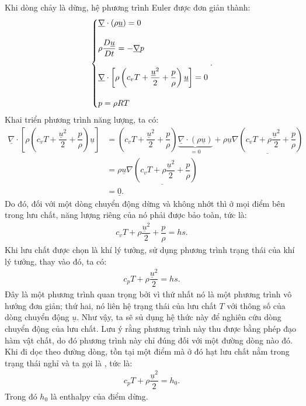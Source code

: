 \documentclass[../../../main.tex]{subfiles}
\begin{document}
Khi dòng chảy là dừng, hệ phương trình Euler được đơn giản thành:
	\begin{equation}
		\begin{dcases}
				\underline{\nabla}\cdot\left(\rho \underline{u}\right)=0\\[10pt]
				\rho\dfrac{D\underline{u}}{Dt}=-\underline{\nabla}p\\[10pt]
				\underline{\nabla}\cdot\left[\rho\left(c_vT+\dfrac{\underline{u}^2}{2}+\dfrac{p}{\rho}\right)\underline{u}\right]=0\\[10pt]
				p=\rho RT
		\end{dcases}.
	\end{equation}
Khai triển phương trình năng lượng, ta có:
	\[
		\begin{aligned}
			\underline{\nabla}\cdot\left[\rho\left(c_vT+\dfrac{\underline{u}^2}{2}+\dfrac{p}{\rho}\right)\underline{u}\right]&=\left(c_vT+\dfrac{\underline{u}^2}{2}+\dfrac{p}{\rho}\right)\underbrace{\underline{\nabla}\cdot\left(\rho\underline{u}\right)}_{=0}+\rho\underline{u}\underline{\nabla\left(c_vT+\rho\dfrac{\underline{u}^2}{2}+\dfrac{p}{\rho}\right)}\\
			&=\rho\underline{u}\underline{\nabla\left(c_vT+\rho\dfrac{\underline{u}^2}{2}+\dfrac{p}{\rho}\right)}\\
			&=\underline{0}.
		\end{aligned}
	\]
Do đó, đối với một dòng chuyển động dừng và không nhớt thì ở mọi điểm bên trong lưu chất, năng lượng riêng của nó phải được bảo toàn, tức là:
	\begin{align}
		\boxed{c_vT+\rho\dfrac{\underline{u}^2}{2}+\dfrac{p}{\rho}=hs}.
	\end{align}
Khi lưu chất được chọn là khí lý tưởng, sử dụng phương trình trạng thái của khí lý tưởng, thay vào đó, ta có:
	\begin{align}
		\boxed{c_pT+\rho\dfrac{\underline{u}^2}{2}=hs}.
	\end{align}
Đây là một phương trình quan trọng bởi vì thứ nhất nó là một phương trình vô hướng đơn giản; thứ hai, nó liên hệ trạng thái của lưu chất $T$ với thông số của dòng chuyển động $\underline{u}$. Như vậy, ta sẽ sủ dụng hệ thức này để nghiên cứu dòng chuyển động của lưu chất. Lưu ý rằng phương trình này thu được bằng phép đạo hàm vật chất, do đó phương trình này chỉ đúng đối với một đường dòng nào đó. Khi đi dọc theo đường dòng, tồn tại một điểm mà ở đó hạt lưu chất nằm trong trạng thái nghỉ và ta gọi là , tức là:
	\begin{align}
		\boxed{c_pT+\rho\dfrac{\underline{u}^2}{2}=h_0}.
	\end{align}
Trong đó $h_0$ là enthalpy của điểm dừng.
	
\end{document}
